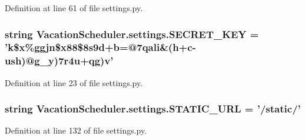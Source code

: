 Definition at line 61 of file settings.\-py.

\hypertarget{namespaceVacationScheduler_1_1settings_a21065396eac0aeb9036c394f47d30f29}{
\subsubsection[{S\-E\-C\-R\-E\-T\-\_\-\-K\-E\-Y}]{\setlength{\rightskip}{0pt plus 5cm}string Vacation\-Scheduler.\-settings.\-S\-E\-C\-R\-E\-T\-\_\-\-K\-E\-Y = 'k\$x\%ggjn\$x88\$8s9d+b=@7qali\&(h+c-\/ush)@g\-\_\-y)7r4u+qg)v'}}\label{namespaceVacationScheduler_1_1settings_a21065396eac0aeb9036c394f47d30f29}


Definition at line 23 of file settings.\-py.

\hypertarget{namespaceVacationScheduler_1_1settings_a815e6fde1e46d971b44b315d794ce944}{
\subsubsection[{S\-T\-A\-T\-I\-C\-\_\-\-U\-R\-L}]{\setlength{\rightskip}{0pt plus 5cm}string Vacation\-Scheduler.\-settings.\-S\-T\-A\-T\-I\-C\-\_\-\-U\-R\-L = '/static/'}}\label{namespaceVacationScheduler_1_1settings_a815e6fde1e46d971b44b315d794ce944}


Definition at line 132 of file settings.\-py.

